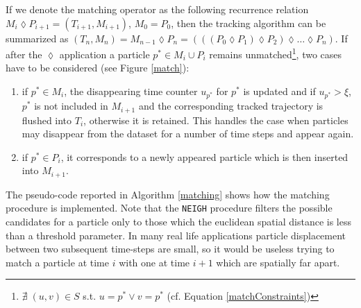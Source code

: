 If we denote the matching operator  as the following recurrence relation $  M_i \lozenge P_{i+1} = (T_{i+1},M_{i+1}) $, $M_0=P_0$, then the  tracking algorithm can be summarized as $(T_n,M_n) = M_{n-1} \lozenge P_{n}=(((P_0 \lozenge P_1)\lozenge P_2) \lozenge \ldots \lozenge P_n)$.
If after the $\lozenge$ application a particle $p^* \in {M_i} \cup P_i $ remains  unmatched\footnote{$\nexists \;(u,v) \in S $ s.t. $  u=p^* \vee v=p^*$ (cf. Equation \ref{matchConstraints})}, two cases have to be considered (see Figure \ref{match}):
\begin{enumerate}
 \item if $p^* \in M_{i}$, the disappearing time counter $u_{p^*}$ for $p^*$ is updated and if $u_{p^*} > \xi$, $p^*$ is not included in $M_{i+1}$ and the corresponding tracked trajectory is flushed into $T_i$, otherwise it is retained. This handles the case when particles may disappear from the dataset for a number of time steps and appear again. 
 \item if $p^* \in P_i$, it corresponds to a newly appeared particle which is then inserted into $M_{i+1}$. 
\end{enumerate}
 
The pseudo-code reported in Algorithm \ref{matching} shows how the matching procedure is implemented. Note that the \texttt{NEIGH} procedure filters the possible candidates for a particle only to those which the euclidean spatial distance is less than a threshold parameter. In many real life applications particle displacement between two subsequent time-steps are small, so it would be useless trying to match a particle at time $i$ with one at time $i+1$ which are spatially far apart.

